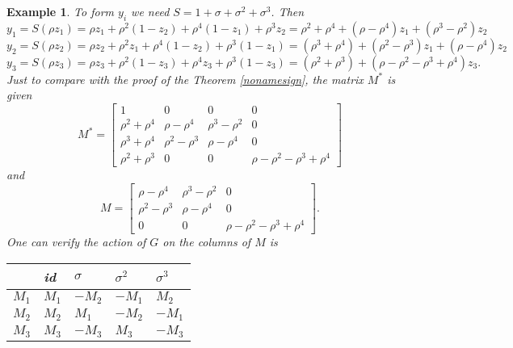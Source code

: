 \documentclass[12pt]{article}
\theoremstyle{plain}
\newtheorem{example}[theorem]{Example}
\begin{document}
\begin{example}
To form $y_i$ we need $S = 1+\sigma + \sigma^2 +\sigma ^3$. Then 
$$y_1 = S(\rho z_1) = \rho z_1 + \rho^2 (1-z_2) + \rho^4 (1-z_1) + \rho^3 z_2 = \rho^2+\rho^4 +(\rho - \rho^4)z_1 + (\rho^3 -\rho^2)z_2 $$ 
$$y_2 = S(\rho z_2) = \rho z_2 + \rho^2 z_1 + \rho^4 (1-z_2) + \rho^3 (1-z_1)= (\rho^3 + \rho^4) + (\rho^2 -\rho^3)z_1+ (\rho-\rho^4)z_2$$
$$y_3 = S(\rho z_3) = \rho z_3 + \rho^2 (1-z_3) + \rho^4 z_3 + \rho^3 (1-z_3)= (\rho^2+\rho^3) + (\rho-\rho^2-\rho^3+\rho^4)z_3.$$
Just to compare with the proof of the Theorem \ref{nonamesign}, the matrix $M^*$ is given 
$$
M^* = \begin{bmatrix}
1 & 0&0&0\\
\rho^2+\rho^4 & \rho -\rho^4 & \rho^3 -\rho^2 & 0\\
\rho^3+\rho^4 & \rho^2 -\rho^3 & \rho -\rho^4 &0 \\
\rho^2+\rho^3 &0 &0 & \rho - \rho^2 -\rho^3+\rho^4
\end{bmatrix}
$$
 and 
 $$
 M = \begin{bmatrix}
 \rho -\rho^4 & \rho^3 -\rho^2 & 0\\
 \rho^2 -\rho^3 & \rho -\rho^4 &0 \\
0 &0 & \rho - \rho^2 -\rho^3+\rho^4
\end{bmatrix}.
$$
One can verify the action of $G$ on the columns of $M$ is 
\begin{table}[H]
\centering
\begin{tabular}{l|llll} 
 & id & $\sigma$ & $\sigma^2$ & $\sigma^3$\\
 \hline
 $M_1$  & $M_1$ & $-M_2$ & $-M_1$ & $M_2$ \\
$M_2$ & $M_2$ & $M_1$ & $-M_2$ & $-M_1$ \\
$M_3$ & $M_3$ & $-M_3$ & $M_3$ & $-M_3$ \\
\end{tabular}
\end{table}
\end{example}




\end{document}
